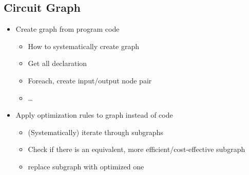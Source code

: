 \subsection{Circuit Graph}
\label{sec:concept_circuitGraph}
\begin{itemize}
    \item Create graph from program code
    \begin{itemize}
        \item How to systematically create graph
        \item Get all declaration
        \item Foreach, create input/output node pair
        \item \dots
    \end{itemize}
    \item Apply optimization rules to graph instead of code
    \begin{itemize}
        \item (Systematically) iterate through subgraphs 
        \item Check if there is an equivalent, more efficient/cost-effective subgraph
        \item replace subgraph with optimized one 
    \end{itemize}
\end{itemize}

